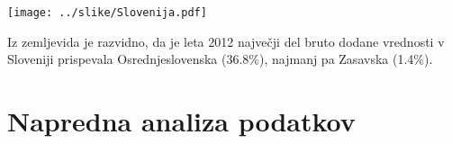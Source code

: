\documentclass[11pt,a4paper]{article}
\begin{document}
\newpage
\begin{center}
 \texttt{[image: ../slike/Slovenija.pdf]}

\end{center}





Iz zemljevida je razvidno, da je leta 2012 največji del bruto dodane vrednosti v Sloveniji prispevala Osrednjeslovenska (36.8\%), najmanj pa Zasavska (1.4\%).





\section{Napredna analiza podatkov}
\end{document}
